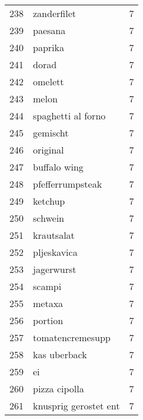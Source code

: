 \begin{tabular}{llr}
238  &                                        zanderfilet &      7 \\
239  &                                            paesana &      7 \\
240  &                                            paprika &      7 \\
241  &                                              dorad &      7 \\
242  &                                            omelett &      7 \\
243  &                                              melon &      7 \\
244  &                                 spaghetti al forno &      7 \\
245  &                                           gemischt &      7 \\
246  &                                           original &      7 \\
247  &                                       buffalo wing &      7 \\
248  &                                   pfefferrumpsteak &      7 \\
249  &                                            ketchup &      7 \\
250  &                                            schwein &      7 \\
251  &                                         krautsalat &      7 \\
252  &                                        pljeskavica &      7 \\
253  &                                         jagerwurst &      7 \\
254  &                                             scampi &      7 \\
255  &                                             metaxa &      7 \\
256  &                                            portion &      7 \\
257  &                                   tomatencremesupp &      7 \\
258  &                                       kas uberback &      7 \\
259  &                                                 ei &      7 \\
260  &                                      pizza cipolla &      7 \\
261  &                              knusprig gerostet ent &      7 \\

\end{tabular}
